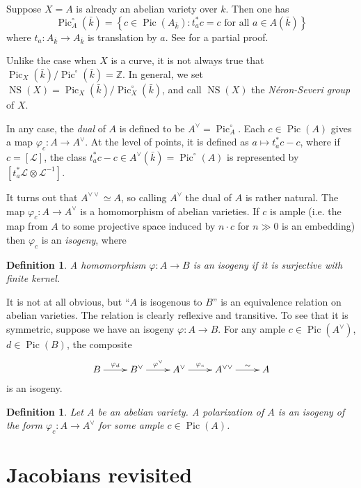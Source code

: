 \documentclass{article}
\DeclareMathOperator{\pic}{Pic}
\newtheorem{definition}[subsection]{Definition}
\theoremstyle{definition}
\begin{document}
Suppose $X=A$ is already an abelian variety over $k$. Then one has 
\[
  \pic_A^\circ(\bar k) = \left\{c\in \pic(A_{\bar k}) : t_a^* c = c\text{ for all }a\in A(\bar k)\right\} 
\]
where $t_a:A_{\bar k}\to A_{\bar k}$ is translation by $a$. See 
\cite[I.8.4]{mi} for a partial proof. 

Unlike the case when $X$ is a curve, it is not always true that 
$\pic_X(\bar k)/\pic^\circ(\bar k) = \mathbb{Z}$. In general, we set 
$\operatorname{NS}(X) = \pic_X(\bar k) / \pic_X^\circ(\bar k)$, and call 
$\operatorname{NS}(X)$ the \emph{N\'eron-Severi group} of $X$. 

In any case, the \emph{dual} of $A$ is defined to be $A^\vee = \pic_A^\circ$. 
Each $c\in \pic(A)$ gives a map $\varphi_c:A\to A^\vee$. At the level of 
points, it is defined as $a\mapsto t_a^* c - c$, where if $c=[\mathscr{L}]$, 
the class $t_a^*c - c\in A^\vee(\bar k) = \pic^\circ(A)$ is represented by 
$[t_a^*\mathscr{L}\otimes\mathscr{L}^{-1}]$. 

It turns out that $A^{\vee\vee} \simeq A$, so calling $A^\vee$ the dual of $A$ 
is rather natural. The map $\varphi_c:A\to A^\vee$ is a homomorphism of abelian 
varieties. If $c$ is ample (i.e. the map from $A$ to some projective space 
induced by $n\cdot c$ for $n\gg 0$ is an embedding) then $\varphi_c$ is an 
\emph{isogeny}, where 

\begin{definition}
A homomorphism $\varphi:A\to B$ is an \emph{isogeny} if it is surjective with 
finite kernel.
\end{definition}

It is not at all obvious, but ``$A$ is isogenous to $B$'' is an equivalence 
relation on abelian varieties. The relation is clearly reflexive and 
transitive. To see that it is symmetric, suppose we have an 
isogeny $\varphi:A\to B$. For any ample $c\in \pic(A^\vee)$, $d\in \pic(B)$, 
the composite 
\[\xymatrix{
  B \ar[r]^-{\varphi_d} 
    & B^\vee \ar[r]^-{\varphi^\vee} 
    & A^\vee \ar[r]^-{\varphi_c}
    & A^{\vee\vee} \ar[r]^-\sim 
    & A
}\]
is an isogeny. 

\begin{definition}
Let $A$ be an abelian variety. A \emph{polarization} of $A$ is an isogeny 
of the form $\varphi_c:A\to A^\vee$ for some ample $c\in \pic(A)$.
\end{definition}





\section{Jacobians revisited}
\end{document}
